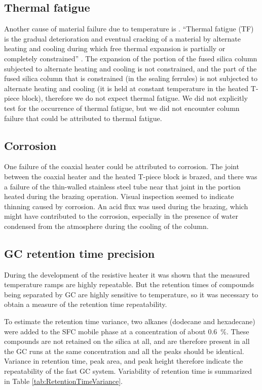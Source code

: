\subsection{Thermal fatigue}

Another cause of material failure due to temperature is . ``Thermal fatigue (TF) is the gradual deterioration and eventual
cracking of a material by alternate heating and cooling during which free
thermal expansion is partially or completely constrained'' \autocite{Rao2001}.
The expansion of the portion of the fused silica column subjected to alternate
heating and cooling is not constrained, and the part of the fused silica column
that is constrained (in the sealing ferrules) is not subjected to alternate
heating and cooling (it is held at constant temperature in the heated T-piece
block), therefore we do not expect thermal fatigue. We did not explicitly test
for the occurrence of thermal fatigue, but we did not encounter column failure
that could be attributed to thermal fatigue.

\subsection{Corrosion}
One failure of the coaxial heater could be attributed to corrosion. The joint
between the coaxial heater and the heated T-piece block is brazed, and there was
a failure of the thin-walled stainless steel tube near that joint in the portion
heated during the brazing operation. Visual inspection seemed to indicate
thinning caused by corrosion. An acid flux was used during the brazing, which
might have contributed to the corrosion, especially in the presence of water
condensed from the atmosphere during the cooling of the column.

\subsection{GC retention time precision}

During the development of the resistive heater it was shown that the measured
temperature ramps are highly repeatable. But the retention times of  compounds
being separated by GC are highly sensitive to temperature, so it was necessary
to obtain a measure of the retention time repeatability.

To estimate the retention time variance, two alkanes (dodecane and hexadecane)
were added to the SFC mobile phase at a concentration of about
\SI{0.6}{\percent}. These compounds are not retained on the silica at all, and
are therefore present in all the GC runs at the same concentration and all the
peaks should be identical. Variance in retention time, peak area, and peak
height therefore indicate the repeatability of the fast GC system. Variability
of retention time is summarized in Table \ref{tab:RetentionTimeVariance}.

